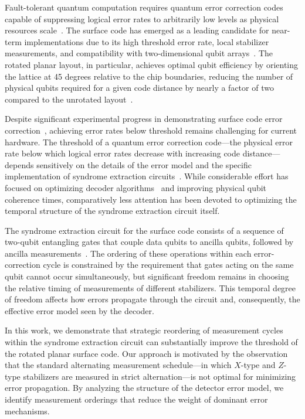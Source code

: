 \documentclass[
    reprint,
    aps,
    prx,
    superscriptaddress,
    longbibliography
]{revtex4-2}
\begin{document}
Fault-tolerant quantum computation requires quantum error correction codes capable of suppressing logical error rates to arbitrarily low levels as physical resources scale~\cite{Shor1996FaultTolerant, Kitaev2003FaultTolerant}. The surface code has emerged as a leading candidate for near-term implementations due to its high threshold error rate, local stabilizer measurements, and compatibility with two-dimensional qubit arrays~\cite{Kitaev2003Anyons, Bravyi1998Quantum, Fowler2012Surface}. The rotated planar layout, in particular, achieves optimal qubit efficiency by orienting the lattice at 45 degrees relative to the chip boundaries, reducing the number of physical qubits required for a given code distance by nearly a factor of two compared to the unrotated layout~\cite{Horsman2012Surface, Tomita2014LowDistance}.

Despite significant experimental progress in demonstrating surface code error correction~\cite{Google2023Suppressing, IBM2024Quantum}, achieving error rates below threshold remains challenging for current hardware. The threshold of a quantum error correction code---the physical error rate below which logical error rates decrease with increasing code distance---depends sensitively on the details of the error model and the specific implementation of syndrome extraction circuits~\cite{Fowler2012Surface, Stephens2014FaultTolerant}. While considerable effort has focused on optimizing decoder algorithms~\cite{Dennis2002Topological, Duclos2010Fast, Delfosse2021Almost, Higgott2023Sparse} and improving physical qubit coherence times, comparatively less attention has been devoted to optimizing the temporal structure of the syndrome extraction circuit itself.

The syndrome extraction circuit for the surface code consists of a sequence of two-qubit entangling gates that couple data qubits to ancilla qubits, followed by ancilla measurements~\cite{Fowler2012Surface}. The ordering of these operations within each error-correction cycle is constrained by the requirement that gates acting on the same qubit cannot occur simultaneously, but significant freedom remains in choosing the relative timing of measurements of different stabilizers. This temporal degree of freedom affects how errors propagate through the circuit and, consequently, the effective error model seen by the decoder.

In this work, we demonstrate that strategic reordering of measurement cycles within the syndrome extraction circuit can substantially improve the threshold of the rotated planar surface code. Our approach is motivated by the observation that the standard alternating measurement schedule---in which $X$-type and $Z$-type stabilizers are measured in strict alternation---is not optimal for minimizing error propagation. By analyzing the structure of the detector error model, we identify measurement orderings that reduce the weight of dominant error mechanisms.
\end{document}
